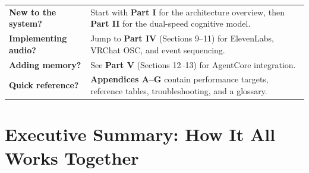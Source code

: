 \documentclass[11pt,letterpaper]{article}
\renewcommand{\arraystretch}{1.3}
\begin{document}
\begin{tcolorbox}[
  enhanced,
  colback=vcteal!5,
  colframe=vcteal!50,
  boxrule=1pt,
  arc=6pt,
  left=12pt, right=12pt, top=10pt, bottom=10pt,
  title={\textcolor{white}{\sffamily\bfseries How to Use This Guide}},
  colbacktitle=vcteal,
  fonttitle=\sffamily\bfseries
]
\small
\renewcommand{\arraystretch}{1.4}
\begin{tabularx}{\linewidth}{@{}>{\raggedright\arraybackslash}p{3.6cm}Y@{}}
\textcolor{vcteal}{\textbf{New to the system?}} & Start with \textbf{Part I} for the architecture overview, then \textbf{Part II} for the dual-speed cognitive model. \\
\textcolor{vcpurple}{\textbf{Implementing audio?}} & Jump to \textbf{Part IV} (Sections 9--11) for ElevenLabs, VRChat OSC, and event sequencing. \\
\textcolor{successgreen}{\textbf{Adding memory?}} & See \textbf{Part V} (Sections 12--13) for AgentCore integration. \\
\textcolor{warningamber}{\textbf{Quick reference?}} & \textbf{Appendices A--G} contain performance targets, reference tables, troubleshooting, and a glossary.
\end{tabularx}
\end{tcolorbox}

\vspace{0.4cm}

\begin{center}
\end{center}

\section*{Executive Summary: How It All Works Together}
\end{document}
